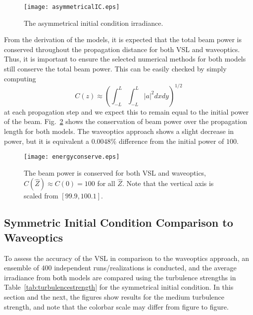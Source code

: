 \documentclass[9pt,twocolumn,twoside]{osajnl}
\begin{document}
\begin{figure}[t!]
	\centering
	\texttt{[image: asymmetricalIC.eps]}
	\caption{The asymmetrical initial condition irradiance.} \label{fig:initialirradianceasymmetrical} \vspace*{-3mm}
\end{figure}


From the derivation of the models, it is expected that the total beam power is conserved throughout the propagation 
distance for both VSL and waveoptics. 
Thus, it is important to ensure the selected numerical methods for both models still conserve the total beam power. 
This can be easily checked by simply computing \[C(z) \approx \left(\int_{-L}^{L}\int_{-L}^{L}\lvert a \rvert^2 dxdy\right)^{1/2}\] at each propagation step and we expect this to remain equal to the initial power of the beam. 
Fig.~\ref{fig:energyconserved} shows the conservation of beam power over the propagation length for both models. The waveoptics approach shows a slight decrease in power, but it is equivalent a $0.0048 \%$ difference from the initial power of $100$.
\begin{figure}[t!]
	\centering
	\texttt{[image: energyconserve.eps]}
	\caption{The beam power is conserved for both VSL and waveoptics, 
	$C(\widehat{Z}) \approx C(0)=100$ for all $\widehat{Z}$. 
	Note that the vertical axis is scaled from $[99.9, 100.1]$. }\label{fig:energyconserved} \vspace*{-3mm}
\end{figure}


\vspace*{-3mm}
\subsection{Symmetric Initial Condition Comparison to Waveoptics}


To assess the accuracy of the VSL in comparison to the waveoptics approach, 
an ensemble of 400 independent runs/realizations is conducted, and the average 
irradiance from \textcolor{black}{both} models are compared using the turbulence 
strengths in Table~\ref{tab:turbulencestrength} for the symmetrical initial condition. 
In this section and the next, the figures show results for the medium turbulence strength, 
and note that the colorbar scale may differ from figure to figure. 
\end{document}
